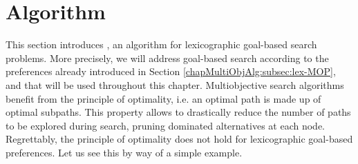 \section{Algorithm \texorpdfstring{\lexgo}{LEXGO*}}
\label{chapMultiObjAlg:subsec:lexgo}

This section introduces \lexgo, an algorithm for lexicographic goal-based search problems. More precisely, we will address goal-based search according to the preferences already introduced in Section \ref{chapMultiObjAlg:subsec:lex-MOP}, and that will be used throughout this chapter. Multiobjective search algorithms benefit from the principle of optimality, i.e. an optimal path is made up of optimal subpaths. This property allows to drastically reduce the number of paths to be explored during search, pruning dominated alternatives at each node. Regrettably, the principle of optimality does not hold for lexicographic goal-based preferences. Let us see this by way of a simple example.

